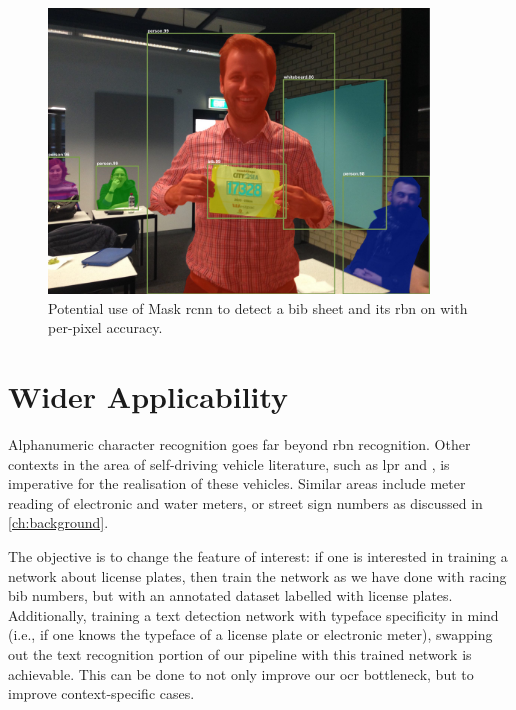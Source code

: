 \begin{figure}
  \centering
  \includegraphics[width=0.9\textwidth]{images/conclusion/mask-rcnn}
  \caption[Potential use of Mask-RCNN on to recognise an RBN]{Potential use of Mask \gls{rcnn} to detect a bib sheet and its \gls{rbn} on with per-pixel accuracy.}
  \label{fig:conclusion:future_work:mask_rcnn}
\end{figure}

\section{Wider Applicability}

Alphanumeric character recognition goes far beyond \gls{rbn} recognition. Other contexts in the area of self-driving vehicle literature, such as \gls{lpr} and , is imperative for the realisation of these vehicles. Similar areas include meter reading of electronic and water meters, or street sign numbers as discussed in \cref{ch:background}. 

The objective is to change the feature of interest: if one is interested in training a network about license plates, then train the network as we have done with racing bib numbers, but with an annotated dataset labelled with license plates. Additionally, training a text detection network with typeface specificity in mind (i.e., if one knows the typeface of a license plate or electronic meter), swapping out the text recognition portion of our pipeline with this trained network is achievable. This can be done to not only improve our \gls{ocr} bottleneck, but to improve context-specific cases.


